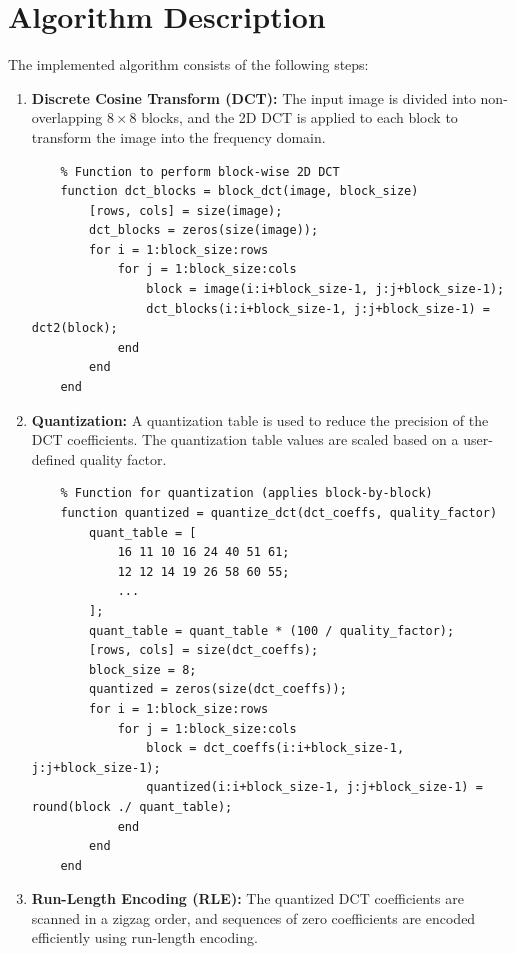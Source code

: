 \documentclass{article}
\begin{document}
\section{Algorithm Description}
The implemented algorithm consists of the following steps:
\begin{enumerate}
    \item \textbf{Discrete Cosine Transform (DCT):} 
    The input image is divided into non-overlapping $8 \times 8$ blocks, and the 2D DCT is applied to each block to transform the image into the frequency domain.

    \begin{lstlisting}
    % Function to perform block-wise 2D DCT
    function dct_blocks = block_dct(image, block_size)
        [rows, cols] = size(image);
        dct_blocks = zeros(size(image));
        for i = 1:block_size:rows
            for j = 1:block_size:cols
                block = image(i:i+block_size-1, j:j+block_size-1);
                dct_blocks(i:i+block_size-1, j:j+block_size-1) = dct2(block);
            end
        end
    end
    \end{lstlisting}

    \item \textbf{Quantization:}
    A quantization table is used to reduce the precision of the DCT coefficients. The quantization table values are scaled based on a user-defined quality factor.

    \begin{lstlisting}
    % Function for quantization (applies block-by-block)
    function quantized = quantize_dct(dct_coeffs, quality_factor)
        quant_table = [
            16 11 10 16 24 40 51 61;
            12 12 14 19 26 58 60 55;
            ...
        ];
        quant_table = quant_table * (100 / quality_factor);
        [rows, cols] = size(dct_coeffs);
        block_size = 8;
        quantized = zeros(size(dct_coeffs));
        for i = 1:block_size:rows
            for j = 1:block_size:cols
                block = dct_coeffs(i:i+block_size-1, j:j+block_size-1);
                quantized(i:i+block_size-1, j:j+block_size-1) = round(block ./ quant_table);
            end
        end
    end
    \end{lstlisting}

    \item \textbf{Run-Length Encoding (RLE):}
    The quantized DCT coefficients are scanned in a zigzag order, and sequences of zero coefficients are encoded efficiently using run-length encoding.


\end{enumerate}
\end{document}
